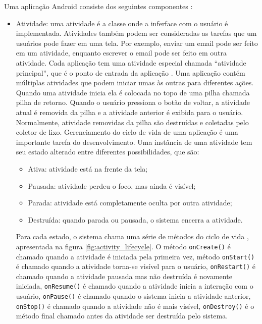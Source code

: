 Uma aplicação Android consiste dos seguintes componentes \cite{Fundamental2016}:
\begin{itemize}
    \item Atividade: uma atividade é a classe onde a inferface com o usuário é
    implementada. Atividades também podem ser consideradas as tarefas que um
    usuários pode fazer em uma tela. Por exemplo, enviar um email pode ser feito
    em um atividade, enquanto escrever o email pode ser feito em outra atividade.
    Cada aplicação tem uma atividade especial chamada “atividade principal”, que
    é o ponto de entrada da aplicação \cite{Atividade2016}. Uma aplicação contém
    múltiplas atividades que podem iniciar umas às outras para diferentes ações.
    Quando uma atividade inicia ela é colocada no topo de uma pilha chamada pilha
    de retorno. Quando o usuário pressiona o botão de voltar, a atividade atual
    é removida da pilha e a atividade anterior é exibida para o usuário. Normalmente,
    atividade removidas da pilha são destruídas e coletadas pelo coletor de lixo.
    Gerenciamento do ciclo de vida de uma aplicação é uma importante tarefa do
    desenvolvimento. Uma instância de uma atividade tem seu estado alterado entre
    diferentes possibilidades, que são:
    \begin{itemize}
        \item Ativa: atividade está na frente da tela;
        \item Pausada: atividade perdeu o foco, mas ainda é visível;
        \item Parada: atividade está completamente oculta por outra atividade;
        \item Destruída: quando parada ou pausada, o sistema encerra a atividade.
    \end{itemize}
    Para cada estado, o sistema chama uma série de métodos do ciclo de vida \cite{CicloVidaAtividade2016},
    apresentada na figura \ref{fig:activity_lifecycle}. O método \texttt{onCreate()} é
    chamado quando a atividade é iniciada pela primeira vez, método \texttt{onStart()} é
    chamado quando a atividade torna-se visível para o usuário, \texttt{onRestart()}
    é chamado quando a atividade pausada mas não destruída é novamente iniciada,
    \texttt{onResume()} é  chamado quando a atividade inicia a interação com o usuário,
    \texttt{onPause()} é chamado quando o sistema inicia a atividade anterior, 
    \texttt{onStop()} é
    chamado quando a atividade não é mais visível, \texttt{onDestroy()} é o método final
    chamado antes da atividade ser destruída pelo sistema.

\end{itemize}
